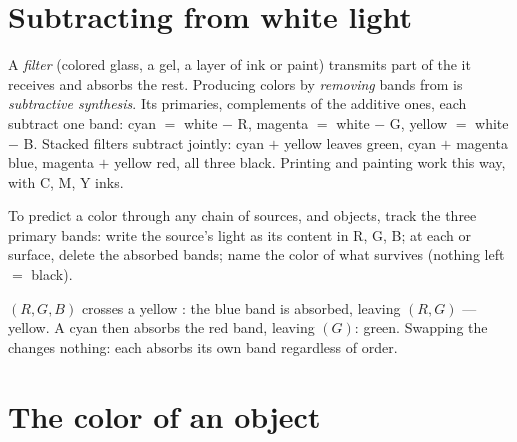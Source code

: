 \section{Subtracting from white light}

\begin{definition}\label{def:g11:color-light-sources:subtractive}
A \emph{filter} (colored glass, a gel, a layer of ink or
paint) transmits part of the  it receives and absorbs the rest.
Producing colors by \emph{removing} bands from  is
\emph{subtractive synthesis}. Its
primaries, complements of the additive ones, each subtract one band:
cyan $=$ white $-$ R, magenta $=$ white $-$ G, yellow $=$ white $-$ B.
Stacked filters subtract jointly: cyan $+$ yellow leaves green, cyan
$+$ magenta blue, magenta $+$ yellow red, all three black. Printing
and painting work this way, with C, M, Y inks.
\end{definition}

\begin{method}\label{met:g11:color-light-sources:bookkeeping}
To predict a color through any chain of sources,  and objects,
track the three primary bands: write the source's light as its content
in R, G, B; at each  or surface, delete the absorbed bands; name
the color of what survives (nothing left $=$ black).
\end{method}

\begin{example}\label{ex:g11:color-light-sources:chain}
 $(R, G, B)$ crosses a yellow : the blue band is
absorbed, leaving $(R, G)$ --- yellow. A cyan  then absorbs the
red band, leaving $(G)$: green. Swapping the  changes nothing:
each absorbs its own band regardless of order.
\end{example}

\section{The color of an object}

